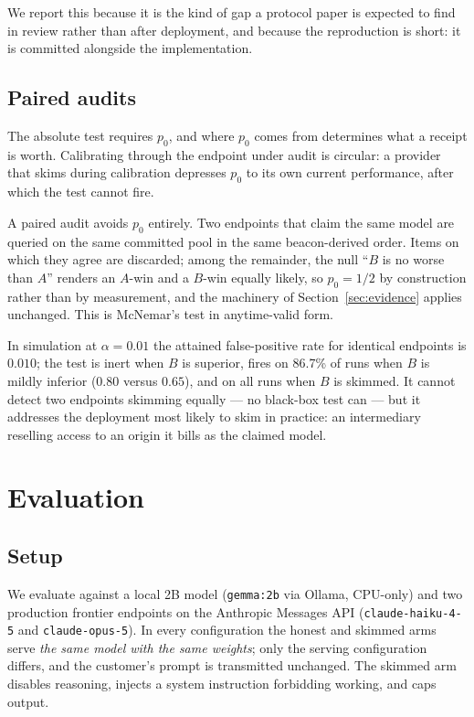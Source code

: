 \documentclass[11pt]{article}
\theoremstyle{definition}
\begin{document}
We report this because it is the kind of gap a protocol paper is expected to
find in review rather than after deployment, and because the reproduction is
short: it is committed alongside the implementation.

\subsection{Paired audits}

The absolute test requires $p_0$, and where $p_0$ comes from determines what a
receipt is worth. Calibrating through the endpoint under audit is circular: a
provider that skims during calibration depresses $p_0$ to its own current
performance, after which the test cannot fire.

A paired audit avoids $p_0$ entirely. Two endpoints that claim the same model
are queried on the same committed pool in the same beacon-derived order. Items
on which they agree are discarded; among the remainder, the null ``$B$ is no
worse than $A$'' renders an $A$-win and a $B$-win equally likely, so $p_0 = 1/2$
by construction rather than by measurement, and the machinery of
Section~\ref{sec:evidence} applies unchanged. This is McNemar's test in
anytime-valid form.

In simulation at $\alpha = 0.01$ the attained false-positive rate for identical
endpoints is $0.010$; the test is inert when $B$ is superior, fires on 86.7\% of
runs when $B$ is mildly inferior ($0.80$ versus $0.65$), and on all runs when
$B$ is skimmed. It cannot detect two endpoints skimming equally --- no black-box
test can --- but it addresses the deployment most likely to skim in practice: an
intermediary reselling access to an origin it bills as the claimed model.

\section{Evaluation}

\subsection{Setup}

We evaluate against a local 2B model (\texttt{gemma:2b} via Ollama, CPU-only) and
two production frontier endpoints on the Anthropic Messages API
(\texttt{claude-haiku-4-5} and \texttt{claude-opus-5}). In every configuration
the honest and skimmed arms serve \emph{the same model with the same weights};
only the serving configuration differs, and the customer's prompt is transmitted
unchanged. The skimmed arm disables reasoning, injects a system instruction
forbidding working, and caps output.
\end{document}

